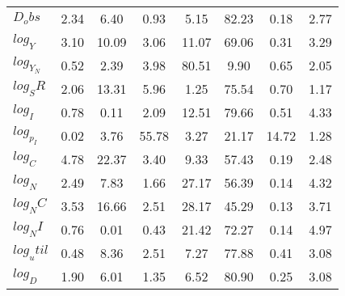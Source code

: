 \begin{center}
\begin{longtable}{lccccccc}
$D_obs     $	 & 	        2.34	 & 	        6.40	 & 	        0.93	 & 	        5.15	 & 	       82.23	 & 	        0.18	 & 	        2.77 \\ 
$log_Y     $	 & 	        3.10	 & 	       10.09	 & 	        3.06	 & 	       11.07	 & 	       69.06	 & 	        0.31	 & 	        3.29 \\ 
$log_Y_N   $	 & 	        0.52	 & 	        2.39	 & 	        3.98	 & 	       80.51	 & 	        9.90	 & 	        0.65	 & 	        2.05 \\ 
$log_SR    $	 & 	        2.06	 & 	       13.31	 & 	        5.96	 & 	        1.25	 & 	       75.54	 & 	        0.70	 & 	        1.17 \\ 
$log_I     $	 & 	        0.78	 & 	        0.11	 & 	        2.09	 & 	       12.51	 & 	       79.66	 & 	        0.51	 & 	        4.33 \\ 
$log_p_I   $	 & 	        0.02	 & 	        3.76	 & 	       55.78	 & 	        3.27	 & 	       21.17	 & 	       14.72	 & 	        1.28 \\ 
$log_C     $	 & 	        4.78	 & 	       22.37	 & 	        3.40	 & 	        9.33	 & 	       57.43	 & 	        0.19	 & 	        2.48 \\ 
$log_N     $	 & 	        2.49	 & 	        7.83	 & 	        1.66	 & 	       27.17	 & 	       56.39	 & 	        0.14	 & 	        4.32 \\ 
$log_NC    $	 & 	        3.53	 & 	       16.66	 & 	        2.51	 & 	       28.17	 & 	       45.29	 & 	        0.13	 & 	        3.71 \\ 
$log_NI    $	 & 	        0.76	 & 	        0.01	 & 	        0.43	 & 	       21.42	 & 	       72.27	 & 	        0.14	 & 	        4.97 \\ 
$log_util  $	 & 	        0.48	 & 	        8.36	 & 	        2.51	 & 	        7.27	 & 	       77.88	 & 	        0.41	 & 	        3.08 \\ 
$log_D     $	 & 	        1.90	 & 	        6.01	 & 	        1.35	 & 	        6.52	 & 	       80.90	 & 	        0.25	 & 	        3.08 \\ 
\end{longtable}
 \end{center}
